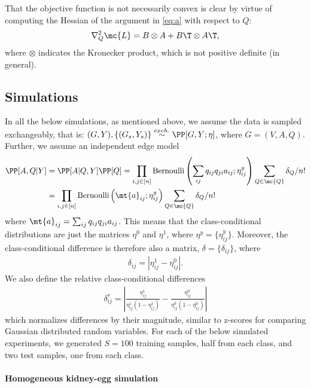 That the objective function is not necessarily convex is clear by virtue of computing the Hessian of the argument in \eqref{eq:a} with respect to $Q$:
\begin{align}
	\nabla_Q^2 \mc{L} =  B \otimes A + B\T \otimes A\T,
\end{align}
where $\otimes$ indicates the Kronecker product, which is not positive definite (in general).


\subsection{Simulations} %
\label{sub:simulations}

In all the below simulations, as mentioned above, we assume the data is sampled exchangeably, that is: $(G,Y), \{(G_s,Y_s)\} \overset{exch.}{\sim} \PP[G,Y; \eta]$, where $G=(V,A,Q)$.  Further, we assume an independent edge model
\begin{align}
\PP[A,Q | Y] &= \PP[A|Q,Y] \PP[Q] = \prod_{i,j \in [n]} \text{Bernoulli}\left(\sum_{ij} q_{ij} q_{ji} a_{ij}; \eta_{ij}^y\right) \sum_{Q\in \mc{Q}} \delta_Q/n! \\
&=  \prod_{i,j \in [n]} \text{Bernoulli}\left(\mt{a}_{ij}; \eta_{ij}^y\right) \sum_{Q\in \mc{Q}} \delta_Q/n!
\end{align}
where $\mt{a}_{ij} = \sum_{ij} q_{ij} q_{ji} a_{ij}$.  This means that the class-conditional distributions are just the matrices $\eta^0$ and $\eta^1$, where $\eta^y=\{\eta_{ij}^y\}$. Moreover, the class-conditional difference is therefore also a matrix, $\delta=\{\delta_{ij}\}$, where
\begin{align}
	\delta_{ij} = | \eta_{ij}^1-\eta_{ij}^0|.
\end{align}
We also define the relative class-conditional differences
\begin{align}
	\delta_{ij}^r = \left| \frac{\eta_{ij}^1}{\eta_{ij}^1 (1-\eta_{ij}^1)} - \frac{\eta_{ij}^0}{\eta_{ij}^0 (1-\eta_{ij}^0)} \right|
\end{align}
which normalizes differences by their magnitude, similar to z-scores for comparing Gaussian distributed random variables. For each of the below simulated experiments, we generated $S=100$ training samples, half from each class, and two test samples, one from each class.  



\paragraph{Homogeneous kidney-egg simulation} %
\label{par:homogeneous_kidney_egg_simulation}

